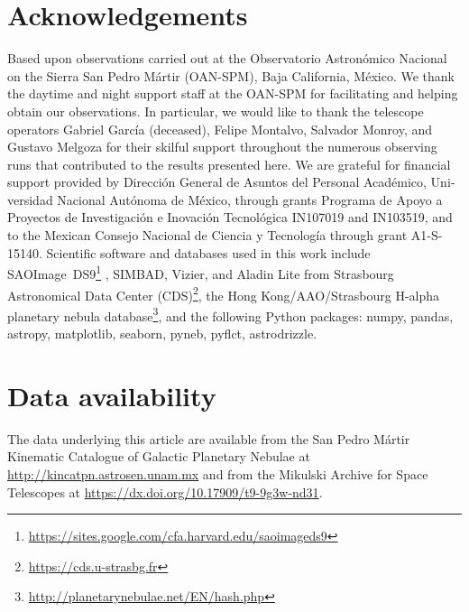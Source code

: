 \documentclass[useAMS, usenatbib]{mnras}
\begin{document}
\section*{Acknowledgements}
Based upon observations carried out at the Observatorio Astronómico Nacional on the Sierra San Pedro Mártir (OAN-SPM), Baja California, México. 
We thank the daytime and night support staff at the OAN-SPM for facilitating and helping obtain our observations.
In particular, we would like to thank the telescope operators
Gabriel García (deceased), Felipe Montalvo, Salvador Monroy, and Gustavo Melgoza
for their skilful support throughout the numerous observing runs that contributed to the results presented here.
We are grateful for financial support provided by
\foreignlanguage{spanish}{
  Dirección General de Asuntos del Personal Académico,
  Universidad Nacional Autónoma de México},
through grants
\foreignlanguage{spanish}{
  Programa de Apoyo a Proyectos de Investigación
  e Inovación Tecnológica}
IN107019 and IN103519,
and to the Mexican
\foreignlanguage{spanish}{
  Consejo Nacional de Ciencia y Tecnología}
through grant A1-S-15140.
Scientific software and databases used in this work include
SAOImage~DS9\footnote{\url{https://sites.google.com/cfa.harvard.edu/saoimageds9}} \citep{Joye:2003a},
SIMBAD, Vizier, and Aladin Lite from Strasbourg Astronomical Data Center (CDS)\footnote{\url{https://cds.u-strasbg.fr}},
the Hong Kong/AAO/Strasbourg H-alpha planetary nebula database\footnote{\url{http://planetarynebulae.net/EN/hash.php}},
and the following Python packages:
numpy, pandas, astropy, matplotlib, seaborn, pyneb, pyflct, astrodrizzle.


\section*{Data availability}
\label{sec:data-availability}

The data underlying this article are available from the
\foreignlanguage{spanish}{San Pedro Mártir} Kinematic Catalogue of Galactic Planetary Nebulae
at \url{http://kincatpn.astrosen.unam.mx}
and from the Mikulski Archive for Space Telescopes
at \url{https://dx.doi.org/10.17909/t9-9g3w-nd31}.
\end{document}
